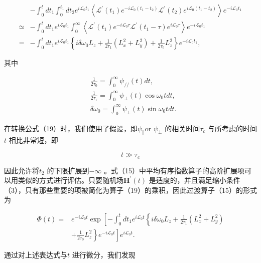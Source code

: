 \documentclass[10pt]{article}
\begin{document}
\[
\begin{aligned}
& -\int_{0}^{t} d t_{1} \int_{0}^{t_{1}} d t_{2} e^{i \mathcal{L}_{0} t_{1}}\left\langle\mathcal{L}^{\prime}\left(t_{1}\right) e^{-i \mathcal{L}_{0}\left(t_{1}-t_{2}\right)} \mathcal{L}^{\prime}\left(t_{2}\right) e^{i \mathcal{L}_{0}\left(t_{1}-t_{2}\right)}\right\rangle e^{-i \mathcal{L}_{0} t_{1}} \\
\simeq & -\int_{0}^{t} d t_{1} e^{i \mathcal{L}_{0} t_{1}} \int_{0}^{\infty}\left\langle\mathcal{L}^{\prime}\left(t_{1}\right) e^{-i \mathcal{L}_{0} \tau} \mathcal{L}^{\prime}\left(t_{1}-\tau\right) e^{i \mathcal{L}_{0} \tau}\right\rangle e^{-i \mathcal{L}_{0} t_{1}} \\
= & -\int_{0}^{t} d t_{1} e^{i \mathcal{L}_{0} t_{1}}\left\{i \delta \omega_{0} L_{z}+\frac{1}{2 \tau_{1}}\left(L_{x}^{2}+L_{y}^{2}\right)+\frac{1}{2 \tau_{0}} L_{z}^{2}\right\} e^{-i \mathcal{L}_{0} t_{1}},
\end{aligned}
\] 

其中

\[
\begin{aligned}
& \frac{1}{2 \tau_{0}}=\int_{0}^{\infty} \psi_{/ /}(t) d t, \\
& \frac{1}{2 \tau_{1}}=\int_{0}^{\infty} \psi_{\perp}(t) \cos \omega_{0} t d t, \\
& \delta \omega_{0}=\int_{0}^{\infty} \psi_{\perp}(t) \sin \omega_{0} t d t .
\end{aligned}
\] 

在转换公式（19）时，我们使用了假设，即\(\psi_{\|}\)or \(\psi_{\perp}\) 的相关时间\(\tau_{c}\) 与所考虑的时间\(t\) 相比非常短，即

\[
t \gg \tau_{c}
\] 

因此允许将\(t_{2}\) 的下限扩展到\(-\infty\) 。式（15）中平均有序指数算子的高阶扩展项可以用类似的方式进行评估。只要随机场\(\boldsymbol{H}^{\prime}(t)\) 是适度的，并且满足缩小条件（3），只有那些重要的项被简化为算子（19）的乘积，因此过渡算子（15）的形式为

\[
\begin{aligned}
\Phi(t)= & e^{-i \mathcal{L}_{0} t} \exp \left[-\int_{0}^{t} d t_{1} e^{i \mathcal{L}_{0} t}\left\{i \delta \omega_{0} L_{z}+\frac{1}{2 \tau_{1}}\left(L_{x}^{2}+L_{y}^{2}\right)\right.\right. \\
& \left.\left.+\frac{1}{2 \tau_{0}} L_{z}^{2}\right\} e^{-i \mathcal{L}_{0} t}\right] e^{i \mathcal{L}_{0} t} .
\end{aligned}
\] 

通过对上述表达式与\(t\) 进行微分，我们发现
\end{document}
